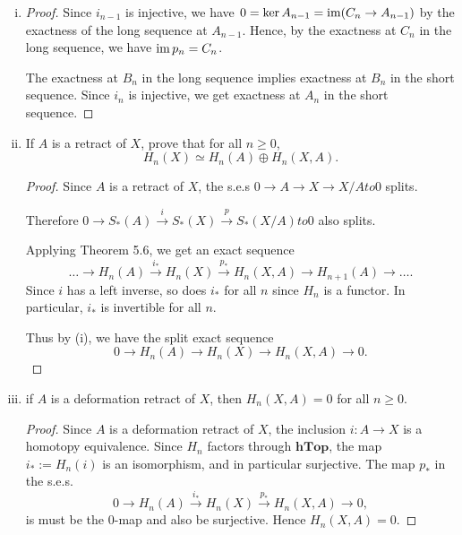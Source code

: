 \documentclass{article}
\begin{document}
\begin{enumerate}[(i)]
\item \begin{proof}
Since $i_{n-1}$ is injective,  we have $0 = \ker A_{n-1} = \operatorname{im} (C_n \to A_{n-1})$ by the exactness of the 
long sequence at $A_{n-1}$. Hence, by the exactness at $C_n$ in the long sequence, we have $\operatorname{im} p_n = C_n$.

The exactness at $B_n$ in the long sequence implies exactness at $B_n$ in the short sequence.  Since
$i_n$ is injective, we get exactness at $A_n$ in the short sequence.
\end{proof}

\item If $A$ is a retract of $X$, prove that for all $n \ge 0$,
$$ H_n(X) \simeq H_n(A) \oplus H_n(X,A).$$

\begin{proof}
Since $A$ is a retract of $X$, the s.e.s $0 \to A \to X \to X/A to 0$ splits.

Therefore $0 \to S_*(A) \overset{i} \to S_*(X) \overset{p} \to S_*(X/A) to 0$ also splits.

Applying Theorem 5.6, we get an exact sequence
$$ \ldots \to H_n(A) \overset{i_*}\to H_n(X) \overset{p_*}\to H_n(X,A) \to H_{n+1}(A) \to \ldots. $$
Since $i$ has a left inverse, so does $i_*$ for all $n$ since $H_n$ is a functor.
In particular, $i_*$ is invertible for all $n$.

Thus by (i), we have the split exact sequence
$$0 \to H_n(A) \to H_n(X) \to H_n(X,A) \to 0.$$
\end{proof}

\item if $A$ is a deformation retract of $X$, then $H_n(X,A) = 0$ for all $n \ge 0$.
\begin{proof}
Since $A$ is a deformation retract of $X$, the inclusion $i:A \to X$ is a homotopy equivalence.
Since $H_n$ factors through $\mathbf{hTop}$, the map $i_*:= H_n(i)$ is an isomorphism,
and in particular surjective.
The map $p_*$ in the s.e.s.
$$0 \to H_n(A) \overset{i_*} \to H_n(X)  \overset{p_*} \to H_n(X,A) \to 0,$$
is must be the $0$-map and also be surjective.  Hence $H_n(X,A) = 0$.
\end{proof}

\end{enumerate}  
\end{document}
